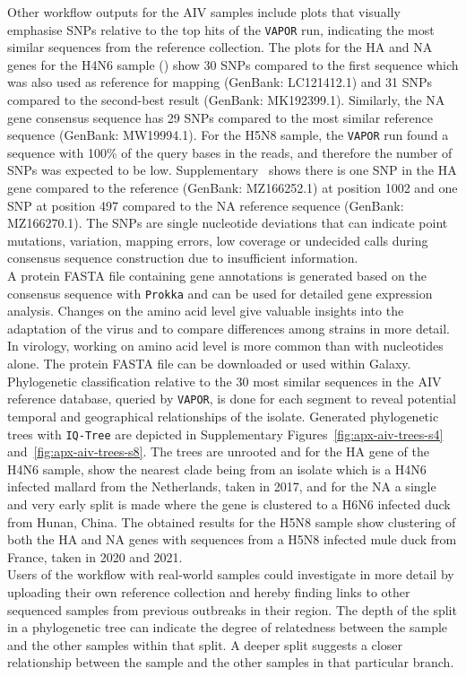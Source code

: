 Other workflow outputs for the \ac{AIV} samples include plots that visually emphasise \acp{SNP} relative to the top hits of the \texttt{VAPOR} run, indicating the most similar sequences from the reference collection. The plots for the \ac{HA} and \ac{NA} genes for the H4N6 sample () show 30 \acp{SNP} compared to the first sequence which was also used as reference for mapping (GenBank: LC121412.1) and 31 \acp{SNP} compared to the second-best result (GenBank: MK192399.1). Similarly, the \ac{NA} gene consensus sequence has 29 \acp{SNP} compared to the most similar reference sequence (GenBank: MW19994.1). For the H5N8 sample, the \texttt{VAPOR} run found a sequence with 100\% of the query bases in the reads, and therefore the number of \acp{SNP} was expected to be low. Supplementary~ shows there is one \ac{SNP} in the \ac{HA} gene compared to the reference (GenBank: MZ166252.1) at position 1002 and one \ac{SNP} at position 497 compared to the \ac{NA} reference sequence (GenBank: MZ166270.1). The \acp{SNP} are single nucleotide deviations that can indicate point mutations, variation, mapping errors, low coverage or undecided calls during consensus sequence construction due to insufficient information. \\
A protein FASTA file containing gene annotations is generated based on the consensus sequence with \texttt{Prokka} and can be used for detailed gene expression analysis. Changes on the amino acid level give valuable insights into the adaptation of the virus and to compare differences among strains in more detail. In virology, working on amino acid level is more common than with nucleotides alone. The protein FASTA file can be downloaded or used within Galaxy.\\
Phylogenetic classification relative to the 30 most similar sequences in the \ac{AIV} reference database, queried by \texttt{VAPOR}, is done for each segment to reveal potential temporal and geographical relationships of the isolate. Generated phylogenetic trees with \texttt{IQ-Tree} are depicted in Supplementary Figures~\ref{fig:apx-aiv-trees-s4} and~\ref{fig:apx-aiv-trees-s8}. The trees are unrooted and for the \ac{HA} gene of the H4N6 sample, show the nearest clade being from an isolate which is a H4N6 infected mallard from the Netherlands, taken in 2017, and for the \ac{NA} a single and very early split is made where the gene is clustered to a H6N6 infected duck from Hunan, China. The obtained results for the H5N8 sample show clustering of both the \ac{HA} and \ac{NA} genes with sequences from a H5N8 infected mule duck from France, taken in 2020 and 2021.\\
Users of the workflow with real-world samples could investigate in more detail by uploading their own reference collection and hereby finding links to other sequenced samples from previous outbreaks in their region. The depth of the split in a phylogenetic tree can indicate the degree of relatedness between the sample and the other samples within that split. A deeper split suggests a closer relationship between the sample and the other samples in that particular branch.

